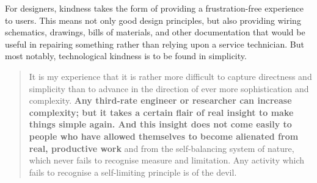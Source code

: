 \documentclass[letterpaper]{article}
\begin{document}


    For designers, kindness takes the form of providing a frustration-free experience to users. This means not only good design principles, but also providing wiring schematics, drawings, bills of materials, and other documentation that would be useful in repairing something rather than relying upon a service technician. But most notably, technological kindness is to be found in simplicity.

    \begin{quote}
      It is my experience that it is rather more difficult to capture directness and simplicity than to advance in the direction of ever more sophistication and complexity. \textbf{Any third-rate engineer or researcher can increase complexity; but it takes a certain flair of real insight to make things simple again. And this insight does not come easily to people who have allowed themselves to become alienated from real, productive work} and from the self-balancing system of nature, which never fails to recognise measure and limitation. Any activity which fails to recognise a self-limiting principle is of the devil.
    \end{quote}
\end{document}
